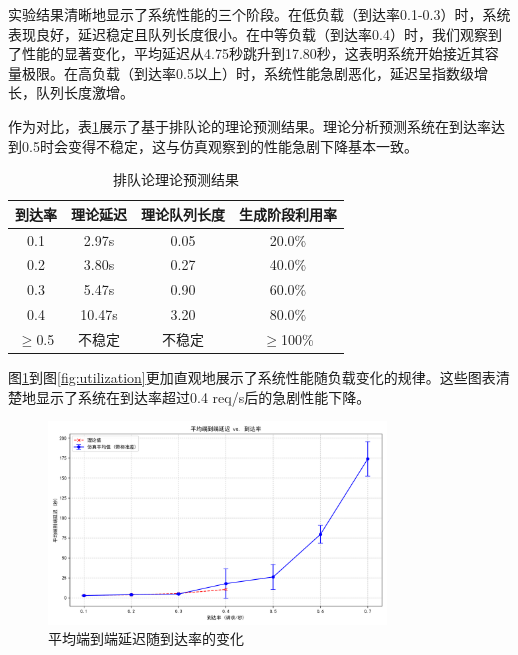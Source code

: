 \documentclass[a4paper]{article}
\begin{document}
实验结果清晰地显示了系统性能的三个阶段。在低负载（到达率0.1-0.3）时，系统表现良好，延迟稳定且队列长度很小。在中等负载（到达率0.4）时，我们观察到了性能的显著变化，平均延迟从4.75秒跳升到17.80秒，这表明系统开始接近其容量极限。在高负载（到达率0.5以上）时，系统性能急剧恶化，延迟呈指数级增长，队列长度激增。

作为对比，表\ref{table:theory}展示了基于排队论的理论预测结果。理论分析预测系统在到达率达到0.5时会变得不稳定，这与仿真观察到的性能急剧下降基本一致。

\begin{table}[H]
  \centering
  \begin{tabular}{|c|c|c|c|}
  \hline
  到达率 & 理论延迟 & 理论队列长度 & 生成阶段利用率 \\
  \hline
  0.1 & 2.97s & 0.05 & 20.0\% \\
  0.2 & 3.80s & 0.27 & 40.0\% \\
  0.3 & 5.47s & 0.90 & 60.0\% \\
  0.4 & 10.47s & 3.20 & 80.0\% \\
  $\geq$0.5 & 不稳定 & 不稳定 & $\geq$100\% \\
  \hline
  \end{tabular}
  \caption{排队论理论预测结果}
  \label{table:theory}
\end{table}

图\ref{fig:latency}到图\ref{fig:utilization}更加直观地展示了系统性能随负载变化的规律。这些图表清楚地显示了系统在到达率超过0.4 req/s后的急剧性能下降。

\begin{figure}[H]
    \centering
    \includegraphics[width=0.8\textwidth]{avg_latency_vs_arrival_rate.png}
    \caption{平均端到端延迟随到达率的变化}
    \label{fig:latency}
\end{figure}
\end{document}
